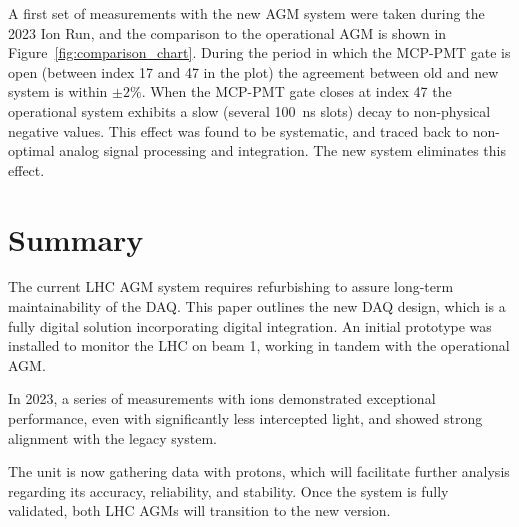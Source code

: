 \vspace{-5mm}
A first set of measurements with the new AGM system were taken during the 2023 Ion Run, 
%
and the comparison to the operational AGM is shown in Figure~\ref{fig:comparison_chart}.
%
During the period in which the MCP-PMT gate is open (between index 17 and 47 in the plot) the agreement between old and new system is within $\pm 2\%$.  
When the MCP-PMT gate closes at index 47 the operational system exhibits a slow (several \SI{100}{ns} slots) decay to non-physical negative values. 
%
%
This effect was found to be  systematic, and traced back to  non-optimal analog signal processing and integration. 
%
The new system eliminates this effect.


\section{Summary}

The current LHC AGM system requires refurbishing to assure long-term maintainability of the DAQ. This paper outlines the new DAQ design, which is a fully digital solution incorporating digital integration. An initial prototype was installed to monitor the LHC on beam 1, working in tandem with the operational AGM.

In 2023, a series of measurements with ions demonstrated exceptional performance, even with significantly less intercepted light, and showed strong alignment with the legacy system.

The unit is now gathering data with protons, which will facilitate further analysis regarding its accuracy, reliability, and stability. Once the system is fully validated, both LHC AGMs will transition to the new version.


%
%
%
%
%
%





